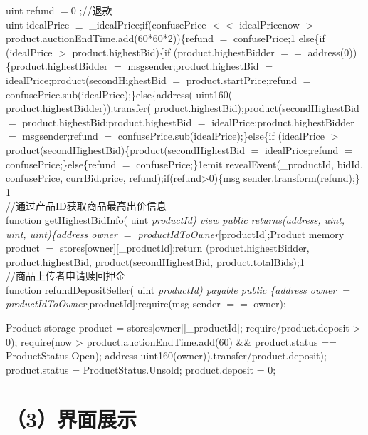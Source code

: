 \documentclass[
  10
]{article}
\newenvironment{Shaded}{}{}
\newcommand{\NormalTok}[1]{#1}
\begin{document}
uint refund \(= 0\) ;//退款\\
uint idealPrice \(\equiv\) \_idealPrice;if(confusePrice \(<  <\)
idealPrice\textbar\textbar now \(>\)
product.auctionEndTime.add(60*60*2))\{refund \(=\) confusePrice;1
else\{if (idealPrice \(>\) product.highestBid)\{if
(product.highestBidder \(= =\) address(0))\{product.highestBidder \(=\)
msgsender;product.highestBid \(=\) idealPrice;product(secondHighestBid
\(=\) product.startPrice;refund \(=\)
confusePrice.sub(idealPrice);\}else\{address( uint160(
product.highestBidder)).transfer(
product.highestBid);product(secondHighestBid \(=\)
product.highestBid;product.highestBid \(=\)
idealPrice;product.highestBidder \(=\) msgsender;refund \(=\)
confusePrice.sub(idealPrice);\}else\{if (idealPrice \(>\)
product(secondHighestBid)\{product(secondHighestBid \(=\)
idealPrice;refund \(=\) confusePrice;\}else\{refund \(=\)
confusePrice;\}1emit revealEvent(\_productId, bidId, confusePrice,
currBid.price, refund);if(refund\textgreater0)\{msg
sender.transform(refund);\}\\
1\\
//通过产品ID获取商品最高出价信息\\
function getHighestBidInfo( uint \emph{productId) view public
returns(address, uint, uint, uint)\{address owner \(=\)
productIdToOwner}{[}productId{]};Product memory product \(=\)
stores{[}owner{]}{[}\_productId{]};return (product.highestBidder,
product.highestBid, product(secondHighestBid, product.totalBids);1\\
//商品上传者申请赎回押金\\
function refundDepositSeller( uint \emph{productId) payable public
\{address owner \(=\) productIdToOwner}{[}productId{]};require(msg
sender \(= =\) owner);

\begin{Shaded}
\begin{Highlighting}[]
\NormalTok{Product storage product = stores[owner][\_productId];  }
\NormalTok{require/product.deposit \textgreater{} 0);  }
\NormalTok{require(now \textgreater{} product.auctionEndTime.add(60) \&\& product.status == ProductStatus.Open);  }
\NormalTok{address uint160(owner)).transfer/product.deposit);  }
\NormalTok{product.status = ProductStatus.Unsold;  }
\NormalTok{product.deposit = 0; }
\end{Highlighting}
\end{Shaded}

\section{（3）界面展示}\label{ux754cux9762ux5c55ux793a-3}
\end{document}
